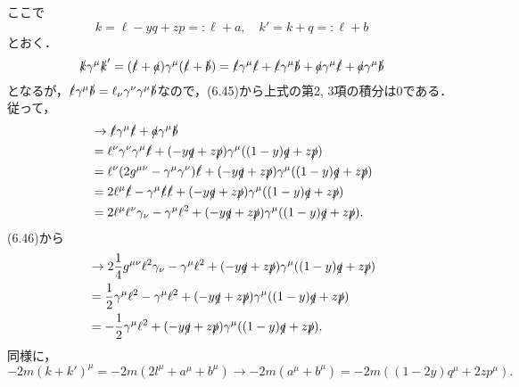 ここで
\[ k = \ell - yq + zp =: \ell + a , \quad k' = k + q =: \ell + b \]
とおく．
\[ \slashed{k} \gamma^\mu \slashed{k}' = (\slashed{\ell} + \slashed{a}) \gamma^\mu (\slashed{\ell} + \slashed{b})
= \slashed{\ell} \gamma^\mu \slashed{\ell} + \slashed{\ell} \gamma^\mu \slashed{b} + \slashed{a} \gamma^\mu \slashed{\ell} + \slashed{a} \gamma^\mu \slashed{b}\]
となるが，$\slashed{\ell} \gamma^\mu \slashed{b} = \ell_\nu \gamma^\nu \gamma^\mu \slashed{b}$なので，(6.45)から上式の第2, 3項の積分は$0$である．従って，
\begin{align*}
  &\to \slashed{\ell} \gamma^\mu \slashed{\ell} + \slashed{a} \gamma^\mu \slashed{b} \\
  &= \ell^\nu \gamma^\nu \gamma^\mu \slashed{\ell} + ( - y\slashed{q} + z\slashed{p} ) \gamma^\mu ((1-y)\slashed{q} + z\slashed{p}) \\
  &= \ell^\nu ( 2g^{\mu\nu} - \gamma^\mu \gamma^\nu) \slashed{\ell} + ( - y\slashed{q} + z\slashed{p} ) \gamma^\mu ((1-y)\slashed{q} + z\slashed{p}) \\
  &= 2 \ell^\mu \slashed{\ell} - \gamma^\mu \slashed{\ell}\slashed{\ell} + ( - y\slashed{q} + z\slashed{p} ) \gamma^\mu ((1-y)\slashed{q} + z\slashed{p}) \\
  &= 2 \ell^\mu \ell^\nu \gamma_\nu - \gamma^\mu \ell^2 + ( - y\slashed{q} + z\slashed{p} ) \gamma^\mu ((1-y)\slashed{q} + z\slashed{p}) .
\end{align*}
(6.46)から
\begin{align*}
  &\to 2 \frac{1}{4} g^{\mu\nu} \ell^2 \gamma_\nu - \gamma^\mu \ell^2 + ( - y\slashed{q} + z\slashed{p} ) \gamma^\mu ((1-y)\slashed{q} + z\slashed{p}) \\
  &= \frac{1}{2} \gamma^\mu \ell^2 - \gamma^\mu \ell^2 + ( - y\slashed{q} + z\slashed{p} ) \gamma^\mu ((1-y)\slashed{q} + z\slashed{p}) \\
  &= -\frac{1}{2} \gamma^\mu \ell^2 + ( - y\slashed{q} + z\slashed{p} ) \gamma^\mu ((1-y)\slashed{q} + z\slashed{p}) .
\end{align*}
同様に，
\[ -2m (k+k')^\mu = -2m (2l^\mu + a^\mu + b^\mu ) \to -2m (a^\mu + b^\mu) = -2m ((1-2y) q^\mu + 2z p^\mu) . \]

